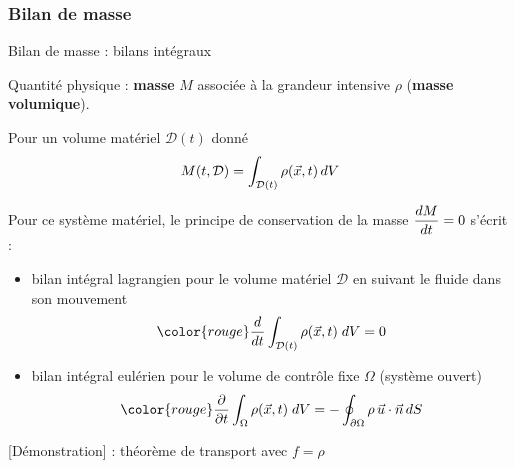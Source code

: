  
\subsubsection{Bilan de masse}

\begin{frame}{Bilan de masse : bilans intégraux}

\small



Quantité physique : \textbf{masse} $M$ associée à la grandeur intensive $\rho$ (\textbf{masse volumique}).

\bigskip

Pour un volume matériel $\mathcal{D}(t)$ donné 
$$
	M(t, \mathcal{D}) = \int_{\mathcal{D}(t)} \rho(\vec{x}, t) \, dV
$$

\medskip 

\pause

Pour ce système matériel, le principe de conservation de la masse $\displaystyle \frac{d M}{dt} = 0$ s'écrit :

\medskip

\begin{itemize}
\item
	bilan intégral lagrangien pour le volume matériel $\mathcal{D}$ en suivant le fluide
	dans son mouvement
	\begin{equation}
		\color{rouge}
		\ddt{} \int_{\mathcal{D}(t)} \rho(\myvec{x}, t) \; dV 
		= 0
		\label{eq:bilan_global_lagrangien_masse}
	\end{equation}
\medskip

\pause

\item
  bilan intégral eulérien pour le volume de contrôle fixe $\Omega$ (système ouvert)
	\begin{equation}
		\color{rouge}
		\dpdt{} \int_{\Omega} \rho(\myvec{x}, t) \; dV 
		=
		- \oint_{\partial \Omega} \rho \,  \myvec{u}\cdot \myvec{n} \, dS
		\label{eq:bilan_global_eulerien_masse}
	\end{equation}
\end{itemize}

{\color{vert} [Démonstration] :} théorème de transport avec $f= \rho$

\pause
\medskip


\vspace{0mm}

\end{frame}


